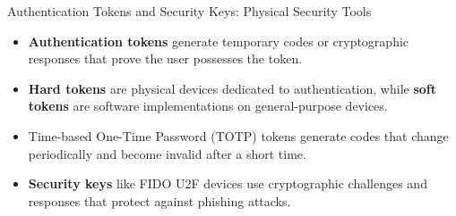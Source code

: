 \documentclass{beamer}
\begin{document}
\begin{frame}{Authentication Tokens and Security Keys: Physical Security Tools}
    \begin{itemize}
        \item \textbf{Authentication tokens} generate temporary codes or cryptographic responses that prove the user possesses the token.
        \item \textbf{Hard tokens} are physical devices dedicated to authentication, while \textbf{soft tokens} are software implementations on general-purpose devices.
        \item Time-based One-Time Password (TOTP) tokens generate codes that change periodically and become invalid after a short time.
        \item \textbf{Security keys} like FIDO U2F devices use cryptographic challenges and responses that protect against phishing attacks.
    \end{itemize}
    
\end{frame}
\end{document}
